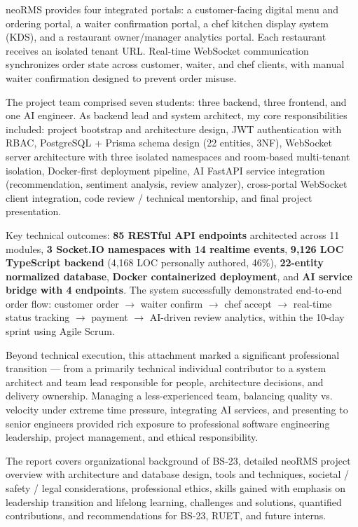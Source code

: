\documentclass[12pt,a4paper,oneside]{report}
\begin{document}
neoRMS provides four integrated portals: a customer-facing digital menu and ordering portal, a waiter confirmation portal, a chef kitchen display system (KDS), and a restaurant owner/manager analytics portal. Each restaurant receives an isolated tenant URL. Real-time WebSocket communication synchronizes order state across customer, waiter, and chef clients, with manual waiter confirmation designed to prevent order misuse.

The project team comprised seven students: three backend, three frontend, and one AI engineer. As backend lead and system architect, my core responsibilities included: project bootstrap and architecture design, JWT authentication with RBAC, PostgreSQL + Prisma schema design (22 entities, 3NF), WebSocket server architecture with three isolated namespaces and room-based multi-tenant isolation, Docker-first deployment pipeline, AI FastAPI service integration (recommendation, sentiment analysis, review analyzer), cross-portal WebSocket client integration, code review / technical mentorship, and final project presentation.

Key technical outcomes: \textbf{85 RESTful API endpoints} architected across 11 modules, \textbf{3 Socket.IO namespaces with 14 realtime events}, \textbf{9,126 LOC TypeScript backend} (4,168 LOC personally authored, 46\%), \textbf{22-entity normalized database}, \textbf{Docker containerized deployment}, and \textbf{AI service bridge with 4 endpoints}. The system successfully demonstrated end-to-end order flow: customer order $\rightarrow$ waiter confirm $\rightarrow$ chef accept $\rightarrow$ real-time status tracking $\rightarrow$ payment $\rightarrow$ AI-driven review analytics, within the 10-day sprint using Agile Scrum.

Beyond technical execution, this attachment marked a significant professional transition --- from a primarily technical individual contributor to a system architect and team lead responsible for people, architecture decisions, and delivery ownership. Managing a less-experienced team, balancing quality vs. velocity under extreme time pressure, integrating AI services, and presenting to senior engineers provided rich exposure to professional software engineering leadership, project management, and ethical responsibility.

The report covers organizational background of BS-23, detailed neoRMS project overview with architecture and database design, tools and techniques, societal / safety / legal considerations, professional ethics, skills gained with emphasis on leadership transition and lifelong learning, challenges and solutions, quantified contributions, and recommendations for BS-23, RUET, and future interns.
\end{document}

